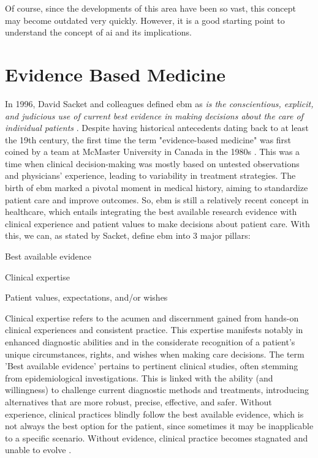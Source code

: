 Of course, since the developments of this area have been so vast, this concept may become outdated very quickly. However, it is a good starting point to understand the concept of \ac{ai} and its implications.




\section{Evidence Based Medicine}\label{subsec:ebm}
In 1996, David Sacket and colleagues defined \ac{ebm} as \textit{is the conscientious, explicit, and judicious use of current best evidence in making decisions about the care of individual patients} \cite{sackettEvidenceBasedMedicine1996}. Despite having historical antecedents dating back to at least the 19th century, the first time the term "evidence-based medicine" was first coined by a team at McMaster University in Canada in the 1980s \cite{thomaBriefHistoryEvidenceBased2015}. This was a time when clinical decision-making was mostly based on untested observations and physicians' experience, leading to variability in treatment strategies. The birth of \ac{ebm} marked a pivotal moment in medical history, aiming to standardize patient care and improve outcomes. So, \ac{ebm} is still a relatively recent concept in healthcare, which entails integrating the best available research evidence with clinical experience and patient values to make decisions about patient care. 
With this, we can, as stated by Sacket, define \ac{ebm} into 3 major pillars:
\begin{myitemize}
    \item Best available evidence
    \item Clinical expertise
    \item Patient values, expectations, and/or wishes
\end{myitemize}

Clinical expertise refers to the acumen and discernment gained from hands-on clinical experiences and consistent practice. This expertise manifests notably in enhanced diagnostic abilities and in the considerate recognition of a patient's unique circumstances, rights, and wishes when making care decisions. The term 'Best available evidence' pertains to pertinent clinical studies, often stemming from epidemiological investigations. This is linked with the ability (and willingness) to challenge current diagnostic methods and treatments, introducing alternatives that are more robust, precise, effective, and safer. 
Without experience, clinical practices blindly follow the best available evidence, which is not always the best option for the patient, since sometimes it may be inapplicable to a specific scenario. Without evidence, clinical practice becomes stagnated and unable to evolve \cite{sackettEvidenceBasedMedicine1996}.



